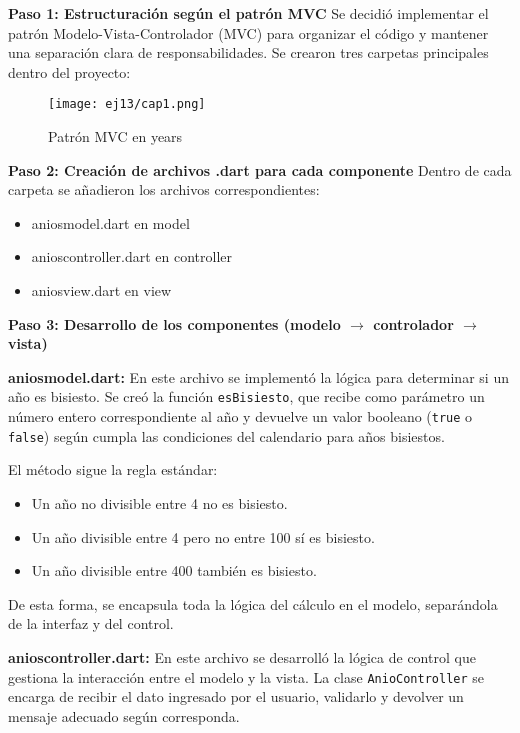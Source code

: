 \textbf{Paso 1: Estructuración según el patrón MVC}  
Se decidió implementar el patrón Modelo-Vista-Controlador (MVC) para organizar el código y mantener una separación clara de responsabilidades.  
Se crearon tres carpetas principales dentro del proyecto: 

\begin{figure}[H]
    \centering
    \texttt{[image: ej13/cap1.png]}
    \caption{Patrón MVC en years}
    \label{fig:ej13il1}
\end{figure}

\textbf{Paso 2: Creación de archivos .dart para cada componente}  
Dentro de cada carpeta se añadieron los archivos correspondientes:  
\begin{itemize}
    \item aniosmodel.dart en model
    \item anioscontroller.dart en controller
    \item aniosview.dart en view
\end{itemize}

\textbf{Paso 3: Desarrollo de los componentes (modelo $\rightarrow$ controlador $\rightarrow$ vista)}  

\textbf{aniosmodel.dart:}  
En este archivo se implementó la lógica para determinar si un año es bisiesto. Se creó la función \texttt{esBisiesto}, que recibe como parámetro un número entero correspondiente al año y devuelve un valor booleano (\texttt{true} o \texttt{false}) según cumpla las condiciones del calendario para años bisiestos.  

El método sigue la regla estándar:  
\begin{itemize}
    \item Un año no divisible entre 4 no es bisiesto.
    \item Un año divisible entre 4 pero no entre 100 sí es bisiesto.
    \item Un año divisible entre 400 también es bisiesto.
\end{itemize}

De esta forma, se encapsula toda la lógica del cálculo en el modelo, separándola de la interfaz y del control.

\textbf{anioscontroller.dart:}  
En este archivo se desarrolló la lógica de control que gestiona la interacción entre el modelo y la vista. La clase \texttt{AnioController} se encarga de recibir el dato ingresado por el usuario, validarlo y devolver un mensaje adecuado según corresponda.  


